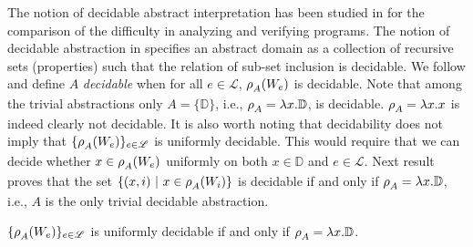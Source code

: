 \documentclass[runningheads]{llncs}
\def\ok#1{\mbox{\raisebox{0ex}[1ex][1ex]{$#1$}}}
\newcommand{\ccL}{\mathscr{L}}
\newcommand{\Domain}{\mathbb{D}}
\newcommand{\auco}[2]{\ok{\rho^{#1}_{#2}}}
\def\ok#1{\mbox{\raisebox{0ex}[1ex][1ex]{$#1$}}}
\def\cAA{\ensuremath{A}}
\newcommand{\sset}[2]{\{#1  ~|~ #2\}}
\begin{document}
The notion of decidable abstract interpretation has been studied in \cite{CGR18} for the comparison of the difficulty in analyzing and verifying programs. The notion of decidable abstraction in \cite{CGR18} specifies an abstract domain as a collection of recursive sets (properties) such that the relation of sub-set inclusion is decidable. We follow \cite{CGR18} and define $\cAA$ {\em decidable\/} when for all $e\in\ccL$, $\auco{}{\cAA}(W_e)$ is decidable. Note that among the trivial abstractions only $\cAA=\{\Domain\}$, i.e., $\auco{}{\cAA}=\lambda x.\Domain$, is decidable. $\auco{}{\cAA} = \lambda x.x$ is indeed clearly not decidable.
It is also worth noting that decidability does not imply that $\{\auco{}{\cAA}(W_e)\}_{e\in\ccL}$ is uniformly decidable. This would require that we can decide whether $x\in\auco{}{\cAA}(W_e)$ uniformly on both $x\in\Domain$ and $e\in\ccL$.
Next result proves that the set $\sset{(x,i)}{x\in\auco{}{\cAA}(W_i)}$ is decidable if and only if $\auco{}{\cAA}=\lambda x.\Domain$, i.e., $\cAA$ is the only trivial decidable abstraction.

\begin{theorem}\label{non-uniformrec}
    $\{\auco{}{\cAA}(W_e)\}_{e\in\ccL}$ is uniformly decidable if and only if $\auco{}{\cAA}=\lambda x.\Domain$.
\end{theorem}
\end{document}
